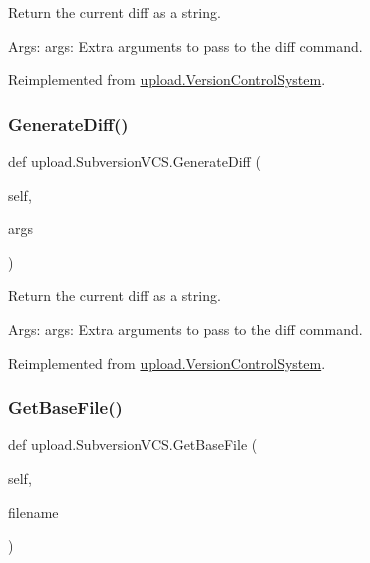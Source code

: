 \begin{DoxyVerb}Return the current diff as a string.

Args:
  args: Extra arguments to pass to the diff command.
\end{DoxyVerb}
 

Reimplemented from \mbox{\hyperlink{classupload_1_1VersionControlSystem_aa5eb260c96e7016dab36b5fc136c9f49}{upload.\+Version\+Control\+System}}.

\mbox{\label{classupload_1_1SubversionVCS_a07c2d341f2c7df2772dd7f85e89b0212}} 
\subsubsection{\texorpdfstring{GenerateDiff()}{GenerateDiff()}\hspace{0.1cm}{\footnotesize\ttfamily [2/2]}}
{\footnotesize\ttfamily def upload.\+Subversion\+V\+C\+S.\+Generate\+Diff (\begin{DoxyParamCaption}\item[{}]{self,  }\item[{}]{args }\end{DoxyParamCaption})}

\begin{DoxyVerb}Return the current diff as a string.

Args:
  args: Extra arguments to pass to the diff command.
\end{DoxyVerb}
 

Reimplemented from \mbox{\hyperlink{classupload_1_1VersionControlSystem_aa5eb260c96e7016dab36b5fc136c9f49}{upload.\+Version\+Control\+System}}.

\mbox{\label{classupload_1_1SubversionVCS_a29dec4941de0824734d6842a2f33ffc3}} 
\subsubsection{\texorpdfstring{GetBaseFile()}{GetBaseFile()}\hspace{0.1cm}{\footnotesize\ttfamily [1/2]}}
{\footnotesize\ttfamily def upload.\+Subversion\+V\+C\+S.\+Get\+Base\+File (\begin{DoxyParamCaption}\item[{}]{self,  }\item[{}]{filename }\end{DoxyParamCaption})}

